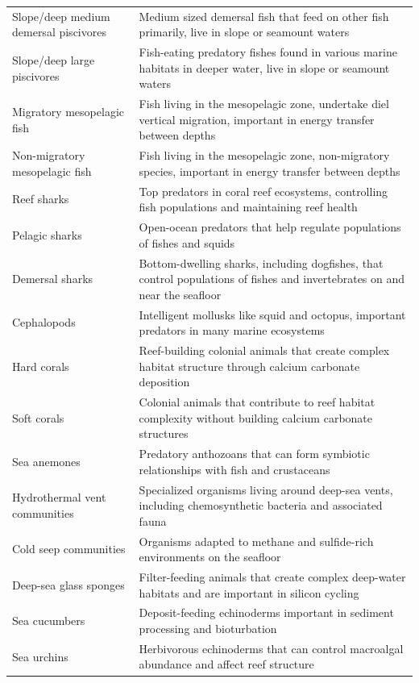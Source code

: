 \begin{longtable}{p{}p{}}
  Slope/deep medium demersal piscivores & Medium sized demersal fish that feed on other fish primarily, live in slope or seamount waters \\
  Slope/deep large piscivores & Fish-eating predatory fishes found in various marine habitats in deeper water, live in slope or seamount waters \\
  Migratory mesopelagic fish & Fish living in the mesopelagic zone, undertake diel vertical migration, important in energy transfer between depths \\
  Non-migratory mesopelagic fish & Fish living in the mesopelagic zone, non-migratory species, important in energy transfer between depths \\
  Reef sharks & Top predators in coral reef ecosystems, controlling fish populations and maintaining reef health \\
  Pelagic sharks & Open-ocean predators that help regulate populations of fishes and squids \\
  Demersal sharks & Bottom-dwelling sharks, including dogfishes, that control populations of fishes and invertebrates on and near the seafloor \\
  Cephalopods & Intelligent mollusks like squid and octopus, important predators in many marine ecosystems \\
  Hard corals & Reef-building colonial animals that create complex habitat structure through calcium carbonate deposition \\
  Soft corals & Colonial animals that contribute to reef habitat complexity without building calcium carbonate structures \\
  Sea anemones & Predatory anthozoans that can form symbiotic relationships with fish and crustaceans \\
  Hydrothermal vent communities & Specialized organisms living around deep-sea vents, including chemosynthetic bacteria and associated fauna \\
  Cold seep communities & Organisms adapted to methane and sulfide-rich environments on the seafloor \\
  Deep-sea glass sponges & Filter-feeding animals that create complex deep-water habitats and are important in silicon cycling \\
  Sea cucumbers & Deposit-feeding echinoderms important in sediment processing and bioturbation \\
  Sea urchins & Herbivorous echinoderms that can control macroalgal abundance and affect reef structure \\

\end{longtable}

